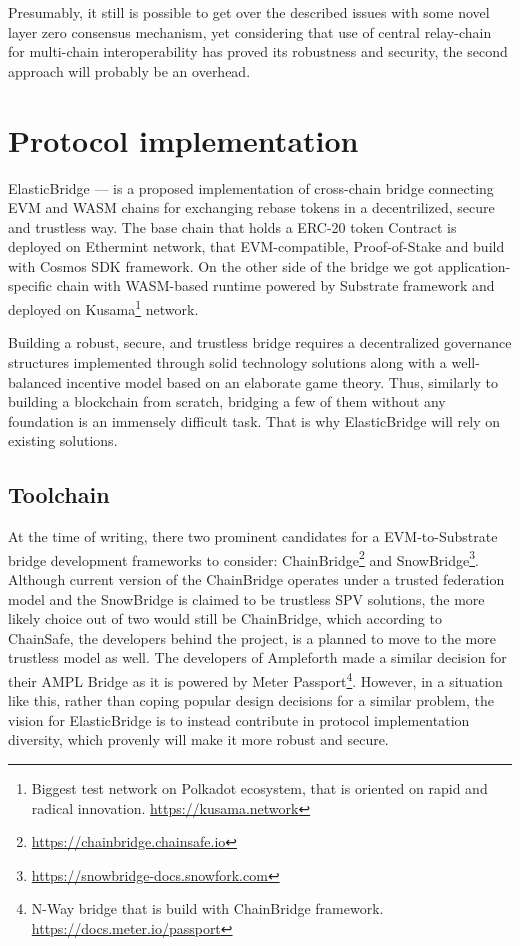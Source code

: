 \documentclass{article}
\begin{document}
Presumably, it still is possible to get over the described issues with some novel layer zero consensus mechanism, yet considering that use of central relay-chain for multi-chain interoperability has proved its robustness and security, the second approach will probably be an overhead.

\section{Protocol implementation}

ElasticBridge --- is a proposed implementation of cross-chain bridge connecting EVM and WASM chains for exchanging rebase tokens in a decentrilized, secure and trustless way. The base chain that holds a ERC-20 token Contract is deployed on Ethermint network, that EVM-compatible, Proof-of-Stake and build with Cosmos SDK framework. On the other side of the bridge we got application-specific chain with WASM-based runtime powered by Substrate framework and deployed on Kusama\footnote{Biggest test network on Polkadot ecosystem, that is oriented on rapid and radical innovation. \url{https://kusama.network}} network.

Building a robust, secure, and trustless bridge requires a decentralized governance structures implemented through solid technology solutions along with a well-balanced incentive model based on an elaborate game theory. Thus, similarly to building a blockchain from scratch, bridging a few of them without any foundation is an immensely difficult task. That is why ElasticBridge will rely on existing solutions.

\subsection{Toolchain}

At the time of writing, there two prominent candidates for a EVM-to-Substrate bridge development frameworks to consider: ChainBridge\footnote{\url{https://chainbridge.chainsafe.io}} and SnowBridge\footnote{\url{https://snowbridge-docs.snowfork.com}}. Although current version of the ChainBridge operates under a trusted federation model and the SnowBridge is claimed to be trustless SPV solutions, the more likely choice out of two would still be ChainBridge, which according to ChainSafe, the developers behind the project, is a planned to move to the more trustless model as well. The developers of Ampleforth made a similar decision for their AMPL Bridge as it is powered by Meter Passport\footnote{N-Way bridge that is build with ChainBridge framework. \url{https://docs.meter.io/passport}}. However, in a situation like this, rather than coping popular design decisions for a similar problem, the vision for ElasticBridge is to instead contribute in protocol implementation diversity, which provenly will make it more robust and secure.
\end{document}
